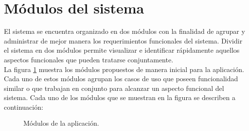 
\section{Módulos del sistema}

    El sistema se encuentra organizado en dos  módulos con la finalidad de agrupar y administrar de mejor manera los requerimientos funcionales del sistema. Dividir el sistema en dos módulos permite visualizar e identificar rápidamente aquellos aspectos funcionales que pueden tratarse conjuntamente. \\

    La figura \ref{fig:ModulosPAEAR} muestra los módulos propuestos de manera inicial para la aplicación. Cada uno de estos módulos agrupan los casos de uso que poseen funcionalidad similar o que trabajan en conjunto para alcanzar un aspecto funcional del sistema. Cada uno de los módulos que se muestran en la figura se describen a continuación:

    \begin{figure}[h!]
	\begin{center}
	\caption{Módulos de la aplicación.}
	\label{fig:ModulosPAEAR}
	\end{center}
    \end{figure}

